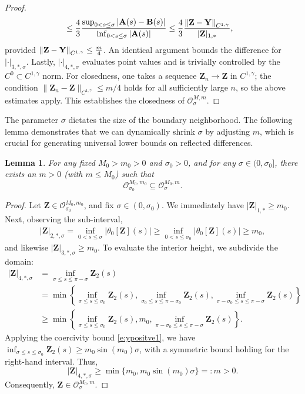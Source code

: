 \documentclass{amsart}
\newcommand{\mA}{\mathbf{A}}
\newcommand{\mB}{\mathbf{B}}
\newcommand{\mZ}{\mathbf{Z}}
\newcommand{\mY}{\mathbf{Y}}
\newtheorem{lemma}[theorem]{Lemma}
\begin{document}
\begin{proof}
\begin{align*}
& \leq  {4\over 3} { \sup_{0< s \leq \sigma} \left| \mA(s) - \mB (s) \right| \over \inf_{0 < s \leq \sigma} |\mA(s) | } 
 \leq  {4\over 3} {\left\| \mZ - \mY \right\|_{C^{1,\gamma}} \over |\mZ|_{1,*}},
\end{align*}
provided $\left\| \mZ - \mY \right\|_{C^{1,\gamma}} \leq {m \over 4}$. An identical argument bounds the difference for $| \cdot |_{3,*,\sigma}$. Lastly, $|\cdot |_{4,*,\sigma}$ evaluates point values and is trivially controlled by the $C^{0} \subset C^{1,\gamma}$ norm. For closedness, one takes a sequence $\mZ_n \to \mZ$ in $C^{1,\gamma}$; the condition $\|\mZ_n - \mZ\|_{C^{1,\gamma}} \leq m/4$ holds for all sufficiently large $n$, so the above estimates apply. This establishes the closedness of $\mathcal{O}^{M,m}_\sigma$.
\end{proof}

The parameter $\sigma$ dictates the size of the boundary neighborhood. The following lemma demonstrates that we can dynamically shrink $\sigma$ by adjusting $m$, which is crucial for generating universal lower bounds on reflected differences.

\begin{lemma} \label{l:resetsigma}
For any fixed $M_0 > m_0 > 0$ and $\sigma_0 > 0$, and for any $\sigma \in (0, \sigma_0]$, there exists an $m > 0$ (with $m \leq M_0$) such that 
\[
\mathcal{O}^{M_0,m_0}_{\sigma_0} \subseteq \mathcal{O}^{M_0,m}_{\sigma}.
\]
\end{lemma}
\begin{proof}
Let $\mZ \in \mathcal{O}^{M_0,m_0}_{\sigma_0}$, and fix $\sigma \in (0, \sigma_0)$. We immediately have $|\mZ|_{1,*} \geq m_0$. Next, observing the sub-interval,
\begin{align*}
|\mZ|_{2,*,\sigma} = \inf_{0 < s \leq \sigma} \left| \theta_0[\mZ](s) \right| \geq \inf_{0 < s \leq \sigma_0} \left| \theta_0[\mZ](s) \right| \geq m_0,
\end{align*}
and likewise $|\mZ|_{3,*,\sigma} \geq m_0$. To evaluate the interior height, we subdivide the domain:
\begin{align*}
\left| \mZ \right|_{4,*,\sigma} & = \inf_{\sigma \leq s \leq \pi -\sigma} \mZ_2(s)  \\
& = \min \left\{ \inf_{\sigma \leq s \leq \sigma_0} \mZ_2(s), 
\inf_{\sigma_0 \leq s \leq \pi - \sigma_0} \mZ_2(s), 
\inf_{\pi - \sigma_0 \leq s \leq \pi -\sigma} \mZ_2(s)  \right\} \\
& \geq \min \left\{ \inf_{\sigma \leq s \leq \sigma_0} \mZ_2(s), m_0, \inf_{\pi - \sigma_0 \leq s \leq \pi -\sigma} \mZ_2(s) \right\}.
\end{align*}
Applying the coercivity bound \eqref{e:ypositve1}, we have $\inf_{\sigma \leq s \leq \sigma_0} \mZ_2(s) \geq m_0 \sin(m_0) \sigma$, with a symmetric bound holding for the right-hand interval. Thus,
\[
|\mZ|_{4,*,\sigma} \geq \min\{ m_0, m_0\sin(m_0) \sigma \} =: m > 0.
\]
Consequently, $\mZ \in \mathcal{O}^{M_0,m}_{\sigma}$.
\end{proof}
\end{document}
